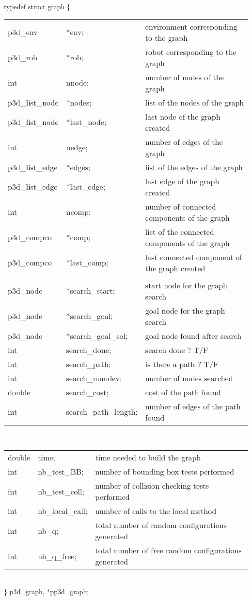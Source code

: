 \begin{itemize}
typedef struct graph \{\\
\begin{tabular}{l l l}
  p3d\_env & *env; & environment corresponding to the graph \\
  p3d\_rob & *rob; & robot corresponding to the graph \\
  int & nnode; & number of nodes of the graph \\
  p3d\_list\_node & *nodes; & list of the nodes of the graph \\
  p3d\_list\_node & *last\_node; & last node of the graph created \\
  int & nedge; & number of edges of the graph \\
  p3d\_list\_edge & *edges; & list of the edges of the graph \\
  p3d\_list\_edge & *last\_edge; &  last edge of the graph created\\
  int & ncomp; & number of connected components of the graph \\
  p3d\_compco & *comp; & list of the connected components of the graph \\
  p3d\_compco & *last\_comp; & last connected component of the graph created \\
              &              &     \\
  p3d\_node   & *search\_start; & start node for the graph search\\
  p3d\_node   & *search\_goal;  & goal node for the graph search\\
  p3d\_node   & *search\_goal\_sol; & goal node found after search\\
  int        & search\_done; & search done ? T/F\\
  int        & search\_path; & is there a path ? T/F\\
  int        & search\_numdev; & number of nodes searched\\
  double     & search\_cost; & cost of the path found\\
  int        & search\_path\_length; & number of edges of the path found\\
\end{tabular}\\
\begin{tabular}{l l l}
  double & time; & time needed to build the graph\\
  int & nb\_test\_BB; & number of bounding box tests performed\\
  int & nb\_test\_coll; & number of collision checking tests performed\\
  int & nb\_local\_call; & number of calls to the local method\\
  int & nb\_q; & total number of random configurations generated\\
  int & nb\_q\_free; &  total number of free random configurations generated\\
\end{tabular}\\
\} p3d\_graph, *pp3d\_graph;\\


\end{itemize}
